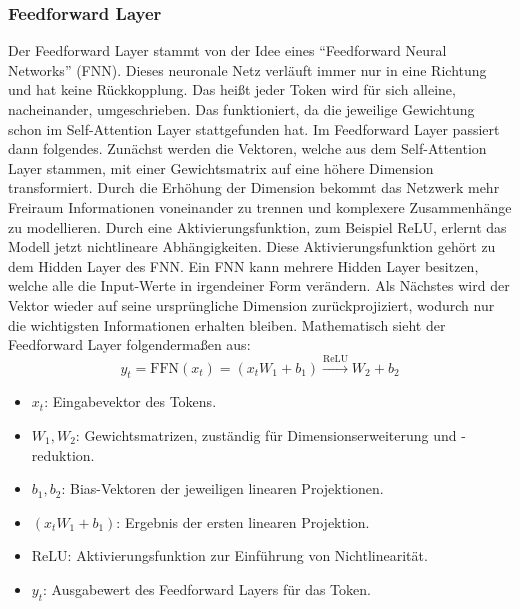 \subsubsection{Feedforward Layer}
Der Feedforward Layer stammt von der Idee eines \enquote{Feedforward Neural Networks} (FNN).
Dieses neuronale Netz verläuft immer nur in eine Richtung und hat keine Rückkopplung.
Das heißt jeder Token wird für sich alleine, nacheinander, umgeschrieben.
Das funktioniert, da die jeweilige Gewichtung schon im Self-Attention Layer stattgefunden hat.
Im Feedforward Layer passiert dann folgendes.
Zunächst werden die Vektoren, welche aus dem Self-Attention Layer stammen,
mit einer Gewichtsmatrix auf eine höhere Dimension transformiert.
Durch die Erhöhung der Dimension bekommt das Netzwerk mehr Freiraum Informationen voneinander zu trennen
und komplexere Zusammenhänge zu modellieren.
Durch eine Aktivierungsfunktion, zum Beispiel ReLU, erlernt das Modell jetzt nichtlineare Abhängigkeiten.
Diese Aktivierungsfunktion gehört zu dem Hidden Layer des FNN.
Ein FNN kann mehrere Hidden Layer besitzen, welche alle die Input-Werte in irgendeiner Form verändern.
Als Nächstes wird der Vektor wieder auf seine ursprüngliche Dimension zurückprojiziert,
wodurch nur die wichtigsten Informationen erhalten bleiben.
Mathematisch sieht der Feedforward Layer folgendermaßen aus:
\[
y_t = \text{FFN}(x_t) = \left( x_t W_1 + b_1 \right) \xrightarrow{\text{ReLU}} W_2 + b_2
\]
\begin{itemize}
  \item $x_t$: Eingabevektor des Tokens.
  \item $W_1, W_2$: Gewichtsmatrizen, zuständig für Dimensionserweiterung und -reduktion.
  \item $b_1, b_2$: Bias-Vektoren der jeweiligen linearen Projektionen.
  \item $\left( x_t W_1 + b_1 \right)$: Ergebnis der ersten linearen Projektion.
  \item $\text{ReLU}$: Aktivierungsfunktion zur Einführung von Nichtlinearität.
  \item $y_t$: Ausgabewert des Feedforward Layers für das Token.
\end{itemize}

